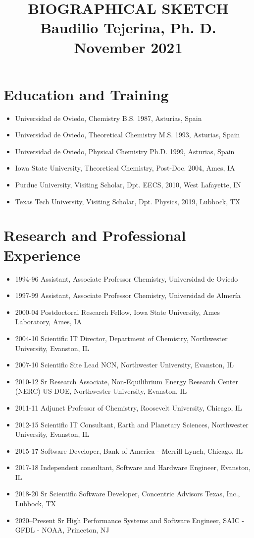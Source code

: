 \documentclass{article}
\title{\textbf{\Large BIOGRAPHICAL SKETCH \\ Baudilio Tejerina, Ph. D. \\ November 2021} \\
}
\author{}
\date{}
\begin{document}
\maketitle
\thispagestyle{empty}
\pagestyle{plain}

\section*{Education and Training}
\begin{itemize}
\item Universidad de Oviedo, Chemistry B.S. 1987, Asturias, Spain
\item Universidad de Oviedo, Theoretical Chemistry M.S. 1993, Asturias, Spain
\item Universidad de Oviedo, Physical Chemistry Ph.D. 1999, Asturias, Spain
\item Iowa State University, Theoretical Chemistry, Post-Doc. 2004, Ames, IA
\item Purdue University, Visiting Scholar, Dpt. EECS, 2010, West Lafayette, IN
\item Texas Tech University, Visiting Scholar, Dpt. Physics, 2019, Lubbock, TX
\end{itemize}

\section*{Research and Professional Experience}
\begin{itemize}
\item 1994-96 Assistant, Associate Professor Chemistry, Universidad de Oviedo
\item 1997-99 Assistant, Associate Professor Chemistry, Universidad de Almer\'{i}a
\item 2000-04 Postdoctoral Research Fellow, Iowa State University, Ames Laboratory, Ames, IA
\item 2004-10 Scientific IT Director, Department of Chemistry, Northwester University, Evanston, IL
\item 2007-10 Scientific Site Lead NCN, Northwester University, Evanston, IL
\item 2010-12 Sr Research Associate, Non-Equilibrium Energy Research Center (NERC) US-DOE, Northwester University, Evanston, IL
\item 2011-11 Adjunct Professor of Chemistry, Roosevelt University, Chicago, IL
\item 2012-15 Scientific IT Consultant, Earth and Planetary Sciences, Northwester University, Evanston, IL
\item 2015-17 Software Developer, Bank of America - Merrill Lynch, Chicago, IL
\item 2017-18 Independent consultant, Software and Hardware Engineer, Evanston, IL
\item 2018-20 Sr Scientific Software Developer, Concentric Advisors Texas, Inc., Lubbock, TX
\item 2020--Present Sr High Performance Systems and Software Engineer, SAIC - GFDL - NOAA, Princeton, NJ

\end{itemize}
\end{document}
